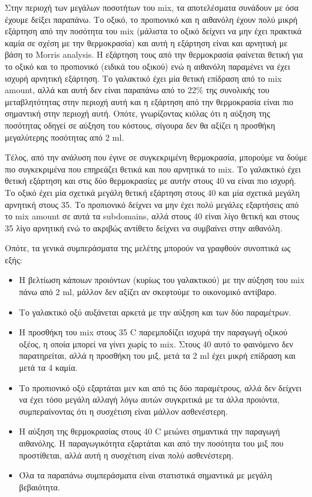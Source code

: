 \documentclass[11pt]{article}
\begin{document}
Στην περιοχή των μεγάλων ποσοτήτων του mix, τα αποτελέσματα συνάδουν με όσα έχουμε δείξει παραπάνω. Το οξικό, το προπιονικό και η αιθανόλη έχουν πολύ μικρή εξάρτηση από την ποσότητα του mix (μάλιστα το οξικό δείχνει να μην έχει πρακτικά καμία σε σχέση με την θερμοκρασία) και αυτή η εξάρτηση είναι και αρνητική με βάση το Morris analysis. Η εξάρτηση τους από την θερμοκρασία φαίνεται θετική για το οξικό και το προπιονικό (ειδικά του οξικού) ενώ η αιθανόλη παραμένει να έχει ισχυρή αρνητική εξάρτηση. Το γαλακτικό έχει μία θετική επίδραση από το mix amount, αλλά και αυτή δεν είναι παραπάνω από το 22\% της συνολικής του μεταβλητότητας στην περιοχή αυτή και η εξάρτηση από την θερμοκρασία είναι πιο σημαντική στην περιοχή αυτή. Οπότε, γνωρίζοντας κιόλας ότι η αύξηση της ποσότητας οδηγεί σε αύξηση του κόστους, σίγουρα δεν θα αξίζει η προσθήκη μεγαλύτερης ποσότητας από 2 ml.

Τέλος, από την ανάλυση που έγινε σε συγκεκριμένη θερμοκρασία, μπορούμε να δούμε πιο συγκεκριμένα που επηρεάζει θετικά και που αρνητικά το mix. Το γαλακτικό έχει θετική εξάρτηση και στις δύο θερμοκρασίες με αυτήν στους 40 να είναι πιο ισχυρή. Το οξικό έχει μία σχετικά μεγάλη θετική εξάρτηση στους 40 και μία σχετικά μεγάλη αρνητική στους 35. Το προπιονικό δείχνει να μην έχει πολύ μεγάλες εξαρτήσεις από το mix amount σε αυτά τα subdomains, αλλά στους 40 είναι λίγο θετική και στους 35 λίγο αρνητική ενώ το ακριβώς αντίθετο δείχνει να συμβαίνει στην αιθανόλη.

Οπότε, τα γενικά συμπεράσματα της μελέτης μπορούν να γραφθούν συνοπτικά ως εξής:
\begin{itemize}
\item Η βελτίωση κάποιων προιόντων (κυρίως του γαλακτικού) με την αύξηση του mix πάνω από 2 ml, μάλλον δεν αξίζει αν σκεφτούμε το οικονομικό αντίβαρο.
\item Το γαλακτικό οξύ αυξάνεται αρκετά με την αύξηση και των δύο παραμέτρων.
\item Η προσθήκη του mix στους 35 C παρεμποδίζει ισχυρά την παραγωγή οξικού οξέος, η οποία μπορεί να γίνει χωρίς το mix. Στους 40 αυτό το φαινόμενο δεν παρατηρείται, αλλά η προσθήκη του μιξ, μετά τα 2 ml έχει μικρή επίδραση και μετά τα 4 καμία.
\item Το προπιονικό οξύ εξαρτάται μεν και από τις δύο παραμέτρους, αλλά δεν δείχνει να έχει τόσο μεγάλη αλλαγή λόγω αυτών συγκριτικά με τα άλλα προιόντα, συμπεραίνοντας ότι η συσχέτιση είναι μάλλον ασθενέστερη.
\item Η αύξηση της θερμοκρασίας στους 40 C μειώνει σημαντικά την παραγωγή αιθανόλης. Η παραγωγικότητα εξαρτάται και από την ποσότητα του μιξ που προστίθεται, αλλά αυτή η συσχέτιση είναι πολύ ασθενέστερη.
\item Όλα τα παραπάνω συμπεράσματα είναι στατιστικά σημαντικά με μεγάλη βεβαιότητα.
\end{itemize}
\end{document}
